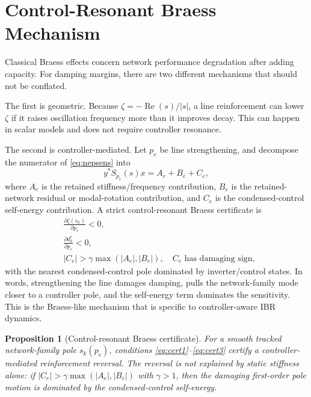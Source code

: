 \documentclass[conference]{IEEEtran}
\newtheorem{proposition}{Proposition}
\newcommand{\Real}{\operatorname{Re}}
\begin{document}
\section{Control-Resonant Braess Mechanism}

Classical Braess effects concern network performance degradation after adding capacity. For damping margins, there are two different mechanisms that should not be conflated.

The first is geometric. Because $\zeta=-\Real(s)/|s|$, a line reinforcement can lower $\zeta$ if it raises oscillation frequency more than it improves decay. This can happen in scalar models and does not require controller resonance.

The second is controller-mediated. Let $p_e$ be line strengthening, and decompose the numerator of \eqref{eq:nepsens} into
\begin{equation}
  y^\ast S_{p_e}(s)x
  =
  A_e+B_e+C_e,
  \label{eq:abc}
\end{equation}
where $A_e$ is the retained stiffness/frequency contribution, $B_e$ is the retained-network residual or modal-rotation contribution, and $C_e$ is the condensed-control self-energy contribution. A strict control-resonant Braess certificate is
\begin{align}
  &\frac{\partial\zeta(s_k)}{\partial p_e}<0,
  \label{eq:cert1}\\
  &\frac{\partial d_k^c}{\partial p_e}<0,
  \label{eq:cert2}\\
  &|C_e|>\gamma\max(|A_e|,|B_e|),\quad C_e \text{ has damaging sign},
  \label{eq:cert3}
\end{align}
with the nearest condensed-control pole dominated by inverter/control states. In words, strengthening the line damages damping, pulls the network-family mode closer to a controller pole, and the self-energy term dominates the sensitivity. This is the Braess-like mechanism that is specific to controller-aware IBR dynamics.

\begin{proposition}[Control-resonant Braess certificate]
For a smooth tracked network-family pole $s_k(p_e)$, conditions \eqref{eq:cert1}--\eqref{eq:cert3} certify a controller-mediated reinforcement reversal. The reversal is not explained by static stiffness alone: if $|C_e|>\gamma\max(|A_e|,|B_e|)$ with $\gamma>1$, then the damaging first-order pole motion is dominated by the condensed-control self-energy.
\end{proposition}
\end{document}
